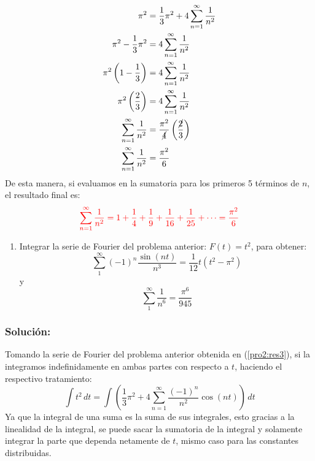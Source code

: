 \begin{multicols}{2}
\begin{align*}
    \pi^{2} &= \frac{1}{3}\pi^{2} + 4 \sum_{n = 1}^{\infty} \frac{1}{n^{2}}\\
    \pi^{2} - \frac{1}{3}\pi^{2} &= 4 \sum_{n = 1}^{\infty} \frac{1}{n^{2}}\\
    \pi^{2}\left(1 - \frac{1}{3}\right) &= 4 \sum_{n = 1}^{\infty} \frac{1}{n^{2}}\\
    \pi^{2}\left(\frac{2}{3}\right) &= 4 \sum_{n = 1}^{\infty} \frac{1}{n^{2}}\\
    \sum_{n = 1}^{\infty} \frac{1}{n^{2}} &= \frac{\pi^{2}}{\cancel{4}}\left(\frac{\cancel{2}}{3}\right)\\
    \sum_{n = 1}^{\infty} \frac{1}{n^{2}} &= \frac{\pi^{2}}{6}
\end{align*}
De esta manera, si evaluamos en la sumatoria para los primeros 5 términos de $n$, el resultado final es:
\begin{equation}
    \textcolor{rojo}{\sum_{n = 1}^{\infty} \frac{1}{n^{2}} = 1 + \frac{1}{4} + \frac{1}{9} + \frac{1}{16} + \frac{1}{25} + \cdots = \frac{\pi^{2}}{6}} \label{pro2:res4}
\end{equation}

\begin{enumerate}[leftmargin=15pt, resume]
    \item Integrar la serie de Fourier del problema anterior: $F(t) = t^{2}$, para obtener:
    \begin{equation*}
        \sum_{1}^{\infty} (-1)^{n} \frac{\sin(nt)}{n^{3}} = \frac{1}{12} t\left(t^{2} - \pi^{2}\right)
    \end{equation*}
    y
    \begin{equation*}
        \sum_{1}^{\infty} \frac{1}{n^{6}} = \frac{\pi^{6}}{945}
    \end{equation*}
\end{enumerate}

\subsubsection*{Solución:}

Tomando la serie de Fourier del problema anterior obtenida en (\ref{pro2:res3}), si la integramos indefinidamente en ambas partes con respecto a $t$, haciendo el respectivo tratamiento:
\begin{equation*}
    \int t^{2} \,dt = \int \left(\frac{1}{3}\pi^{2} + 4 \sum_{n = 1}^{\infty} \frac{\left(-1\right)^{n}}{n^{2}} \cos(nt)\right) \,dt
\end{equation*}
Ya que la integral de una suma es la suma de sus integrales, esto gracias a la linealidad de la integral, se puede sacar la sumatoria de la integral y solamente integrar la parte que dependa netamente de $t$, mismo caso para las constantes distribuidas. 


\end{multicols}
